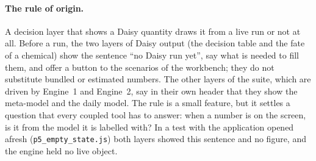 \paragraph{The rule of origin.}
A decision layer that shows a Daisy quantity draws it from a live run or not at all. Before a run, the two layers of Daisy output (the decision table and the fate of a chemical) show the sentence ``no Daisy run yet'', say what is needed to fill them, and offer a button to the scenarios of the workbench; they do not substitute bundled or estimated numbers. The other layers of the suite, which are driven by Engine~1 and Engine~2, say in their own header that they show the meta-model and the daily model. The rule is a small feature, but it settles a question that every coupled tool has to answer: when a number is on the screen, is it from the model it is labelled with? In a test with the application opened afresh (\texttt{p5\_empty\_state.js}) both layers showed this sentence and no figure, and the engine held no live object.



